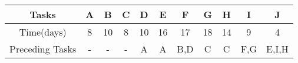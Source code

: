 \begin{center}
\begin{tabular}{|c| c| c| c| c| c| c |c| c |c |c|}

\hline
Tasks & A &  B & C & D & E & F & G & H & I & J \\ \hline
Time(days) & 8 & 10 & 8 & 10 & 16 & 17 & 18 & 14 & 9 & 4 \\ \hline
Preceding Tasks & \-- & \-- & \-- & A & A & B,D & C & C & F,G & E,I,H \\ \hline
\end{tabular}

 \end{center}